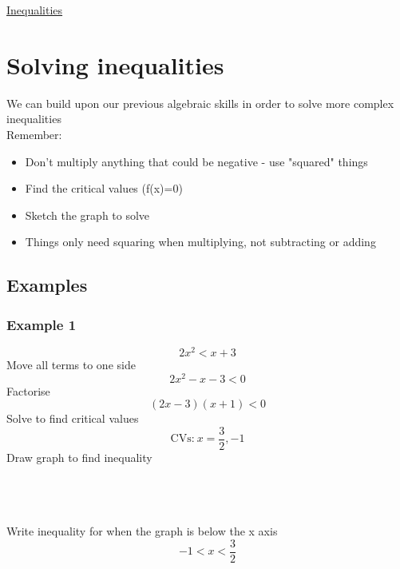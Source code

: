 \documentclass{article}[18pt]
\begin{document}
\begin{center}
\underline{\huge Inequalities}
\end{center}
\section{Solving inequalities}
We can build upon our previous algebraic skills in order to solve more complex inequalities\\
Remember:
\begin{itemize}
\item Don't multiply anything that could be negative - use "squared" things
\item Find the critical values (f(x)=0)
\item Sketch the graph to solve
\item Things only need squaring when multiplying, not subtracting or adding
\end{itemize}
\subsection{Examples}
\subsubsection{Example 1}
$$2x^2<x+3$$
Move all terms to one side
$$2x^2-x-3<0$$
Factorise
$$(2x-3)(x+1)<0$$
Solve to find critical values
$$\textrm{CVs:} \ x=\frac{3}{2},-1$$
Draw graph to find inequality\\
\\
\\
\\
Write inequality for when the graph is below the x axis
$$-1<x<\frac{3}{2}$$
\newpage
\end{document}
